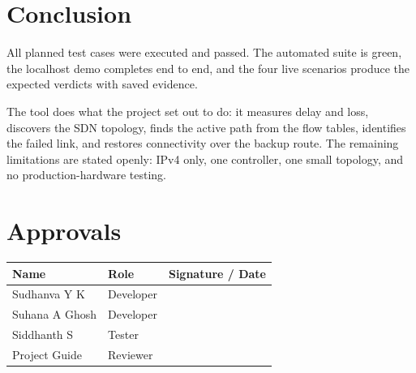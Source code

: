 \documentclass[11pt,a4paper]{article}
\begin{document}
\section{Conclusion}
All planned test cases were executed and passed. The automated suite is green, the localhost demo completes end to end, and the four live scenarios produce the expected verdicts with saved evidence.

The tool does what the project set out to do: it measures delay and loss, discovers the SDN topology, finds the active path from the flow tables, identifies the failed link, and restores connectivity over the backup route. The remaining limitations are stated openly: IPv4 only, one controller, one small topology, and no production-hardware testing.

\section{Approvals}
\begin{center}
\renewcommand{\arraystretch}{2.0}
\begin{tabular}{|p{5.2cm}|p{4.0cm}|p{4.0cm}|}
\hline
\textbf{Name} & \textbf{Role} & \textbf{Signature / Date} \\
\hline
Sudhanva Y K & Developer & \\
\hline
Suhana A Ghosh & Developer & \\
\hline
Siddhanth S & Tester & \\
\hline
Project Guide & Reviewer & \\
\hline
\end{tabular}
\end{center}
\end{document}
